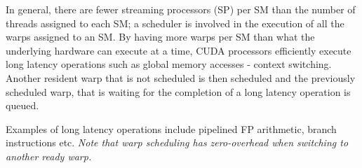 In general, there are fewer streaming processors (SP) per SM than
the number of threads assigned to each SM; a scheduler is involved
in the execution of all the warps assigned to an SM. By having
more warps per SM than what the underlying hardware can execute at
a time, CUDA processors efficiently execute long latency operations
such as global memory accesses - context switching. Another resident
warp that is not scheduled is then scheduled and the previously
scheduled warp, that is waiting for the completion of a long latency
operation is queued.

Examples of long latency operations include pipelined FP arithmetic,
branch instructions etc. \textit{Note that warp scheduling has zero-overhead when switching to another ready warp.}
